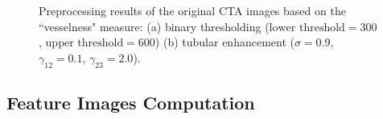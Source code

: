 \begin{figure}[t]
\centering
{}
\hfil
{}
\caption{Preprocessing results of the original CTA images based on the ``vesselness" measure: (a) binary thresholding ($\text{lower threshold} = 300$, $\text{upper threshold} = 600$) (b) tubular enhancement ($\sigma = 0.9$, $\gamma_{12} = 0.1$, $\gamma_{23} = 2.0$).}%
\label{fig:Preprocessing}
\end{figure}

\subsection{Feature Images Computation}

